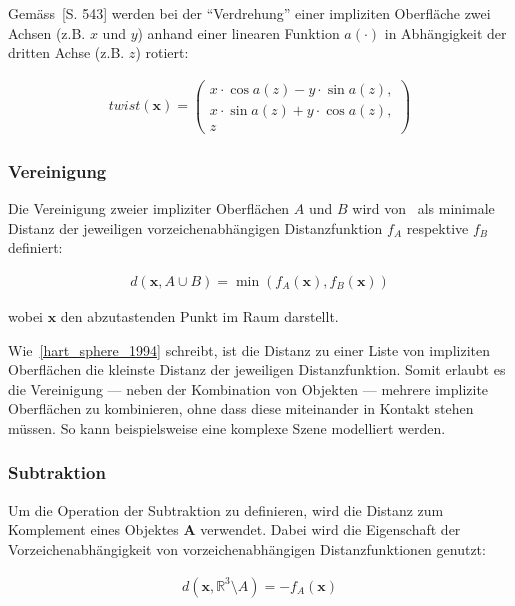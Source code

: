 Gemäss~\cite{hart_sphere_1994}[S. 543] werden bei der ``Verdrehung'' einer
impliziten Oberfläche zwei Achsen (z.B. $x$ und $y$) anhand einer linearen Funktion $a(\cdot)$ in
Abhängigkeit der dritten Achse (z.B. $z$) rotiert:

\begin{gather}
    twist(\bm{x}) = \begin{pmatrix} 
        x \cdot \cos{a(z)} - y \cdot \sin{a(z)},\\
        x \cdot \sin{a(z)} + y \cdot \cos{a(z)},\\
        z
    \end{pmatrix}
\end{gather}

\subsubsection{Vereinigung}
\label{ssubsec:implicit_surfaces_ops_union}

Die Vereinigung zweier impliziter Oberflächen $A$ und $B$ wird
von~\cite{hart_sphere_1994} als minimale Distanz der jeweiligen
vorzeichenabhängigen  Distanzfunktion $f_{A}$ respektive $f_{B}$ definiert:

\begin{gather}
    d(\bm{x}, A \cup B) = \min(f_{A}(\bm{x}), f_{B}(\bm{x}))
\end{gather}

wobei $\bm{x}$ den abzutastenden Punkt im Raum darstellt.

Wie~\ref{hart_sphere_1994} schreibt, ist die Distanz zu einer Liste von
impliziten Oberflächen die kleinste Distanz der jeweiligen Distanzfunktion.
Somit erlaubt es die Vereinigung --- neben der Kombination von Objekten ---
mehrere implizite Oberflächen zu kombinieren, ohne dass diese miteinander in
Kontakt stehen müssen. So kann beispielsweise eine komplexe Szene modelliert
werden.

\subsubsection{Subtraktion}
\label{ssubsec:implicit_surfaces_ops_subtraction}

Um die Operation der Subtraktion zu definieren, wird die Distanz zum Komplement
eines Objektes $\bm{A}$ verwendet. Dabei wird die Eigenschaft der
Vorzeichenabhängigkeit von vorzeichenabhängigen Distanzfunktionen genutzt:

\begin{gather}
    d(\bm{x}, \mathbb{R}^{3} \setminus A) = -f_{A}(\bm{x})
\end{gather}

